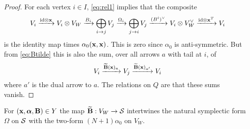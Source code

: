 \documentclass{amsart}
\newcommand{\balpha}{\boldsymbol{\alpha}}
\theoremstyle{definition}
\newcommand\VW{V_W}
\newcommand\Y{Y}
\begin{document}
\begin{proof}
For each vertex $i\in I$, \eqref{eq:rel1} implies that the composite
\begin{equation}\label{eq:inR}
    V_{i} \xrightarrow{\textup{id} \otimes \bfx} V_{i} \otimes \VW \xrightarrow{B_{i}} \bigoplus_{i \rightarrow j} V_j \xrightarrow{\Omega_i} \bigoplus_{j \rightarrow i} V_j \xrightarrow{(B^i)^\vee} V_{i} \otimes \VW^\vee \xrightarrow{\textup{id} \otimes \bfx^T} V_i
\end{equation}
is the identity map times $\alpha_0(\mathbf{x},\mathbf{x})$. This is zero since $\alpha_0$ is anti-symmetric. But from \eqref{eq:Btilde} this is also the sum, over all arrows $a$ with tail at $i$, of 
$$ V_{i} \xrightarrow{\widetilde{\mathbf{B}}(\mathbf{x})_a} V_{j} \xrightarrow{\widetilde{\mathbf{B}}(\mathbf{x})_{a'}} V_{i}  $$
where $a'$ is the dual arrow to $a$. The relations on $Q$ are that these sums vanish.
\end{proof}


\begin{lemma}\label{lem:symp2}
For $(\bfx, \balpha, \bfB) \in \Y$ the map $\widetilde{\bfB}: \VW \to \cS$ intertwines the natural symplectic form $\Omega$ on $\mathcal{S}$ with the two-form $(N+1)\alpha_0$ on $\VW$.
\end{lemma}
\end{document}
